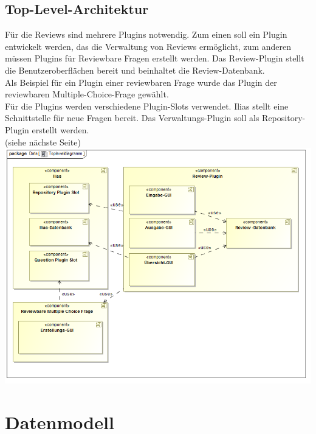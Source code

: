 \documentclass[a4paper]{scrreprt}
\begin{document}
\section{Top-Level-Architektur}
Für die Reviews sind mehrere Plugins notwendig. Zum einen soll ein Plugin entwickelt werden, das die Verwaltung von Reviews ermöglicht, zum anderen müssen Plugins für Reviewbare Fragen erstellt werden. Das Review-Plugin stellt die Benutzeroberflächen bereit und beinhaltet die Review-Datenbank.\\
Als Beispiel für ein Plugin einer reviewbaren Frage wurde das Plugin der reviewbaren Multiple-Choice-Frage gewählt.\\
Für die Plugins werden verschiedene Plugin-Slots verwendet. Ilias stellt eine Schnittstelle für neue Fragen bereit. Das Verwaltungs-Plugin soll als Repository-Plugin erstellt werden.\\ 
(siehe nächste Seite)\\

\includegraphics[width=1.0\textwidth]{Component_Diagram__Topleveldiagramm.png}
\label{Toplevel-Architektur}

\chapter{Datenmodell}
\end{document}
